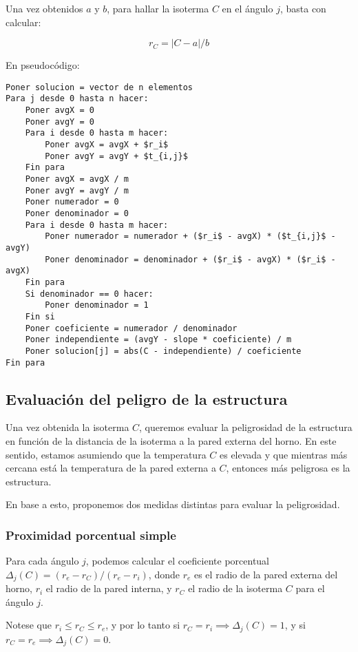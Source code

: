 Una vez obtenidos $a$ y $b$, para hallar la isoterma $C$ en el ángulo $j$, basta con calcular:

$$r_C = |C - a|/b$$

En pseudocódigo:

\begin{lstlisting}[mathescape=true]
Poner solucion = vector de n elementos
Para j desde 0 hasta n hacer:
    Poner avgX = 0
    Poner avgY = 0
    Para i desde 0 hasta m hacer:
        Poner avgX = avgX + $r_i$
        Poner avgY = avgY + $t_{i,j}$
    Fin para
    Poner avgX = avgX / m
    Poner avgY = avgY / m
    Poner numerador = 0
    Poner denominador = 0
    Para i desde 0 hasta m hacer:
        Poner numerador = numerador + ($r_i$ - avgX) * ($t_{i,j}$ - avgY)
        Poner denominador = denominador + ($r_i$ - avgX) * ($r_i$ - avgX)
    Fin para
    Si denominador == 0 hacer:
        Poner denominador = 1
    Fin si
    Poner coeficiente = numerador / denominador
    Poner independiente = (avgY - slope * coeficiente) / m
    Poner solucion[j] = abs(C - independiente) / coeficiente
Fin para
\end{lstlisting}

\subsection{Evaluación del peligro de la estructura}

Una vez obtenida la isoterma $C$, queremos evaluar la peligrosidad de la estructura en función de la distancia de la isoterma a la pared externa del horno. En este sentido, estamos asumiendo que la temperatura $C$ es elevada y que mientras más cercana está la temperatura de la pared externa a $C$, entonces más peligrosa es la estructura.

En base a esto, proponemos dos medidas distintas para evaluar la peligrosidad.

\subsubsection{Proximidad porcentual simple}

Para cada ángulo $j$, podemos calcular el coeficiente porcentual $\Delta_j(C) = (r_e - r_C)/(r_e - r_i)$, donde $r_e$ es el radio de la pared externa del horno, $r_i$ el radio de la pared interna, y $r_C$ el radio de la isoterma $C$ para el ángulo $j$.

Notese que $r_i \leq r_C \leq r_e$, y por lo tanto si $r_C = r_i \implies \Delta_j(C) = 1$, y si $r_C = r_e \implies \Delta_j(C) = 0$.

